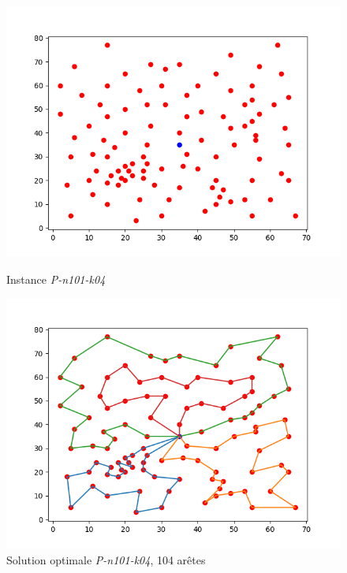 \documentclass[a4paper,11pt]{article}%
\begin{document}
\begin{figure}
        \begin{minipage}[c]{.46\linewidth}
        \centering
        \includegraphics[scale=0.4]{Instance10104}
        
        \caption{Instance \emph{P-n101-k04}}
        \label{P10104}
    \end{minipage}
    \hfill%
    \begin{minipage}[c]{.46\linewidth}
        \centering
        \includegraphics[scale=0.4]{Solution10104}
        
        \caption{Solution optimale \emph{P-n101-k04}, 104 arêtes}
        \label{solP10104}
    \end{minipage}
\end{figure}
\end{document}
